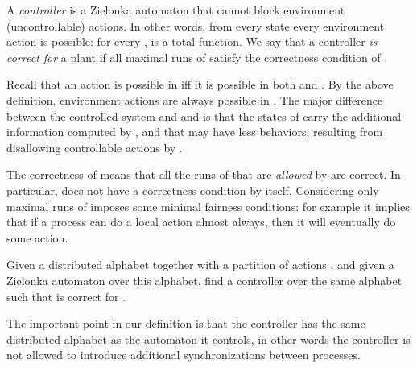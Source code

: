 \documentclass[10pt,a4paper]{article}
\begin{document}
\begin{definition}
  A \emph{controller} is a Zielonka automaton that cannot block
  environment (uncontrollable) actions. In other words, from every
state every environment action is possible: for every
  ,  is a total function.  We say that a controller
   \emph{is correct for} a plant  if all maximal runs of  satisfy the correctness condition of .
\end{definition}

Recall that an action is possible in   iff it is possible in both  and . By the above
  definition, environment actions
  are always possible in . The major difference between the
  controlled system  and
and  is that the states of  carry  the
additional information computed by , and that  may have less behaviors, resulting from disallowing controllable actions
  by .

The correctness of  means that all the runs of  that are
\emph{allowed} by  are correct. In particular,  does not have
a correctness condition by itself. Considering only maximal runs of
 imposes some minimal fairness conditions: for example
it implies that if a process can do a local action almost
always, then it will eventually do some action. 

\begin{definition}
  Given a distributed alphabet  together with a partition of actions , and
  given a Zielonka automaton  over this alphabet, find a controller  over the same alphabet such that  is
  correct for .
\end{definition}











The important point in our definition is that the controller has
the same distributed alphabet as the automaton it controls, in other
words the controller is  not allowed to introduce additional
synchronizations between processes.  
\end{document}
